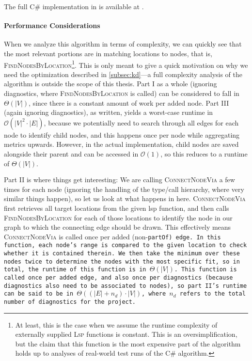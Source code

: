 \documentclass[../thesis]{subfiles}
\begin{document}
The full C\# implementation in \SEE{} is available at .

\paragraph{Performance Considerations}
When we analyze this algorithm in terms of complexity, we can quickly see that the most relevant portions are in matching locations to nodes, that is, \textsc{FindNodesByLocation}\footnote{
	At least, this is the case when we assume the runtime complexity of externally supplied \textsc{Lsp} functions is constant.
	This is an oversimplification, but the claim that this function is the most expensive part of the algorithm holds up to analyses of real-world test runs of the C\# algorithm.
}.
This is only meant to give a quick motivation on why we need the optimization described in \cref{subsec:kd}---a full complexity analysis of the algorithm is outside the scope of this thesis.
Part I as a whole (ignoring diagnostics, where \textsc{FindNodesByLocation} is called) can be considered to fall in $\Theta(|V|)$, since there is a constant amount of work per added node.
Part III (again ignoring diagnostics), as written, yields a worst-case runtime in $\mathcal{O}(|V|^2 \cdot |E|)$, because we potentially need to search through all edges for each node to identify child nodes, and this happens once per node while aggregating metrics upwards.
However, in the actual implementation, child nodes are saved alongside their parent and can be accessed in $\mathcal{O}(1)$, so this reduces to a runtime of $\Theta(|V|)$.

Part II is where things get interesting:
We are calling \textsc{ConnectNodeVia} a few times for each node (ignoring the handling of the type/call hierarchy, where very similar things happen), so let us look at what happens in here.
\textsc{ConnectNodeVia} first retrieves all target locations from the given \gls{lsp} function, and then calls \textsc{FindNodesByLocation} for each of those locations to identify the node in our graph to which the connecting edge should be drawn.
This effectively means \textsc{ConnectNodeVia} is called once per added (non-\tt{partOf}) edge.
In this function, each node's range is compared to the given location to check whether it is contained therein.
We then take the minimum over these nodes twice to determine the nodes with the most specific fit, so in total, the runtime of this function is in $\Theta(|V|)$.
This function is called once per added edge, and also once per diagnostics (because diagnostics also need to be associated to nodes), so part II's runtime can be said to be in $\Theta((|E| + n_d) \cdot |V|)$, where $n_d$ refers to the total number of diagnostics for the project.
\end{document}
